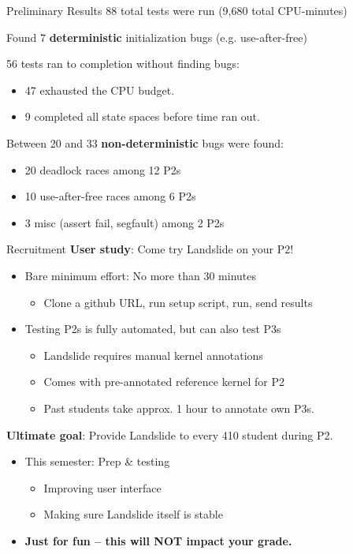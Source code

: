 \documentclass[xcolor=dvipsnames]{beamer}
\begin{document}
\begin{frame}{Preliminary Results}
	88 total tests were run (9,680 total CPU-minutes)
	\linegap

	Found 7 {\bf deterministic} initialization bugs (e.g. use-after-free)
	\linegap

	56 tests ran to completion without finding bugs:
	\begin{itemize}
		\item 47 exhausted the CPU budget.
		\item 9 completed all state spaces before time ran out.
	\end{itemize}
	\linegap

	Between 20 and 33 {\bf non-deterministic} bugs were found:
	\begin{itemize}
		\item 20 deadlock races among 12 P2s
		\item 10 use-after-free races among 6 P2s
		\item 3 misc (assert fail, segfault) among 2 P2s
	\end{itemize}
\end{frame}

\begin{frame}{Recruitment}
	\textbf{User study}: Come try Landslide on your P2!
	\begin{itemize}
		\item Bare minimum effort: No more than 30 minutes
		\begin{itemize}
			\item Clone a github URL, run setup script, run, send results
		\end{itemize}
		\item Testing P2s is fully automated, but can also test P3s
		\begin{itemize}
			\item Landslide requires manual kernel annotations
			\item Comes with pre-annotated reference kernel for P2
			\item Past students take approx. 1 hour to annotate own P3s.
		\end{itemize}
	\end{itemize}
	\pause
	\linegap

	{\bf Ultimate goal}: Provide Landslide to every 410 student during P2.
	\begin{itemize}
		\item This semester: Prep \& testing
			\begin{itemize}
				\item Improving user interface
				\item Making sure Landslide itself is stable
			\end{itemize}
		\item {\bf \large Just for fun -- this will NOT impact your grade.}
	\end{itemize}
\end{frame}
\end{document}
